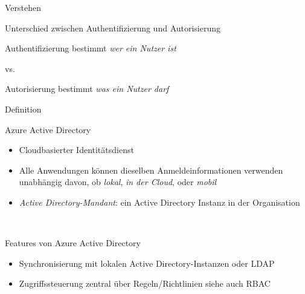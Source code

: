 \documentclass{scrartcl}
\newenvironment{flashcard}[2][]{%
    #1
    \vfill
    \centerline{\Large{#2}}
    \vfill
    \newpage
}
{\newpage}
\begin{document}
    \begin{flashcard}[Verstehen]{Unterschied zwischen Authentifizierung und Autorisierung}
        \begin{center}
            Authentifizierung bestimmt \emph{wer ein Nutzer ist}
            \vspace{5mm}

            vs.
            \vspace{5mm}

            Autorisierung bestimmt \emph{was ein Nutzer darf}
        \end{center}
    \end{flashcard}

    \begin{flashcard}[Definition]{Azure Active Directory}
        \begin{itemize}
            \item Cloudbasierter Identitätsdienst
            \item Alle Anwendungen können dieselben Anmeldeinformationen verwenden\newline
            unabhängig davon, ob \emph{lokal}, \emph{in der Cloud}, oder \emph{mobil}
            \item \emph{Active Directory-Mandant}: ein Active Directory Instanz in der Organisation
        \end{itemize}
    \end{flashcard}

    \begin{flashcard}[\ ]{Features von Azure Active Directory}
        \begin{itemize}
            \item Synchronisierung mit lokalen Active Directory-Instanzen oder LDAP
            \item Zugriffssteuerung zentral über Regeln/Richtlinien\newline
            siehe auch RBAC
        \end{itemize}
    \end{flashcard}
\end{document}
